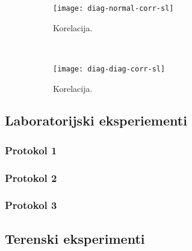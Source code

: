 \begin{figure}[!htb]
	\centering
	\begin{subfigure}[t]{0.45\columnwidth}
		\texttt{[image: diag-normal-corr-sl]}
		\caption{Korelacija.}
		\label{fig:corr-diag-normal}
	\end{subfigure}
	~
	\begin{subfigure}[t]{0.45\columnwidth}
		\texttt{[image: diag-diag-corr-sl]}
		\caption{Korelacija.}
		\label{fig:corr-diag-diag}
	\end{subfigure}
	\caption[]{}
	\label{fig:corr-diag}
\end{figure}


\subsection{Laboratorijski eksperiementi}









\subsubsection{Protokol 1}











\subsubsection{Protokol 2}











\subsubsection{Protokol 3}












\subsection{Terenski eksperimenti}












